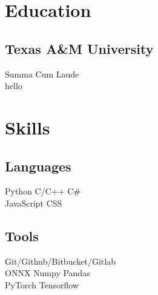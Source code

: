 \documentclass[]{resume-openfont}
\begin{document}
\begin{minipage}[t]{1\textwidth} 
\end{minipage}

\vspace{2.5 mm}

\begin{minipage}[t]{1\textwidth} 
\begin{multicols}{2}
    \section{\Large Education} 
    \subsection{Texas A\&M University}
    Summa Cum Laude \\
    hello
    \sectionsep
    \vfill\null

    \columnbreak

    \section{\Large Skills}
    \subsection{Languages}
    Python \textbullet{} C/C++ \textbullet{} C\# \\
    JavaScript \textbullet{} CSS \\
    \vfill\null
    \subsection{Tools}
    Git/Github/Bitbucket/Gitlab \\ 
    ONNX \textbullet{} Numpy \textbullet{} Pandas \\
    PyTorch \textbullet{} Tensorflow \\
    \sectionsep
    \vfill\null

\end{multicols}
\end{minipage} 
\end{document}
